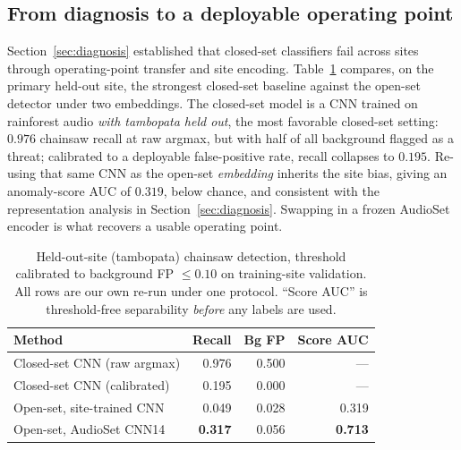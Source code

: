 \subsection{From diagnosis to a deployable operating point}

Section~\ref{sec:diagnosis} established that closed-set classifiers fail across
sites through operating-point transfer and site encoding. Table~\ref{tab:headline}
compares, on the primary held-out site, the strongest closed-set baseline against
the open-set detector under two embeddings. The closed-set model is a CNN trained
on rainforest audio \emph{with tambopata held out}, the most favorable closed-set
setting: $0.976$ chainsaw recall at raw argmax, but with half of all background
flagged as a threat; calibrated to a deployable false-positive rate, recall
collapses to $0.195$. Re-using that same CNN as the open-set \emph{embedding}
inherits the site bias, giving an anomaly-score AUC of $0.319$, below chance, and
consistent with the representation analysis in Section~\ref{sec:diagnosis}.
Swapping in a frozen AudioSet encoder is what recovers a usable operating point.

\begin{table}[t]
\centering
\caption{Held-out-site (tambopata) chainsaw detection, threshold calibrated to
background FP $\le 0.10$ on training-site validation. All rows are our own
re-run under one protocol. ``Score AUC'' is threshold-free separability
\emph{before} any labels are used.}
\label{tab:headline}
\small
\begin{tabular}{lrrr}
\toprule
Method & Recall & Bg FP & Score AUC \\
\midrule
Closed-set CNN (raw argmax)       & 0.976 & 0.500 & --- \\
Closed-set CNN (calibrated)       & 0.195 & 0.000 & --- \\
Open-set, site-trained CNN        & 0.049 & 0.028 & 0.319 \\
Open-set, AudioSet CNN14          & \textbf{0.317} & 0.056 & \textbf{0.713} \\
\bottomrule
\end{tabular}
\end{table}

